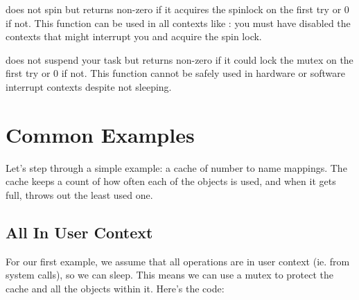 \documentclass[a4paper,8pt,english]{sphinxmanual}
\begin{document}
 does not spin but returns non-zero if it
acquires the spinlock on the first try or 0 if not. This function can be
used in all contexts like : you must have
disabled the contexts that might interrupt you and acquire the spin
lock.

{\hyperref[kernel\string-hacking/locking:c.mutex_trylock]{\emph{}}} does not suspend your task but returns
non-zero if it could lock the mutex on the first try or 0 if not. This
function cannot be safely used in hardware or software interrupt
contexts despite not sleeping.


\section{Common Examples}
\label{kernel-hacking/locking:common-examples}
Let's step through a simple example: a cache of number to name mappings.
The cache keeps a count of how often each of the objects is used, and
when it gets full, throws out the least used one.


\subsection{All In User Context}
\label{kernel-hacking/locking:all-in-user-context}
For our first example, we assume that all operations are in user context
(ie. from system calls), so we can sleep. This means we can use a mutex
to protect the cache and all the objects within it. Here's the code:
\end{document}
